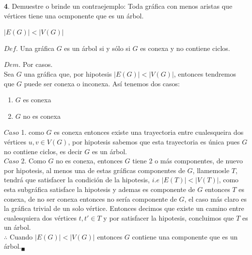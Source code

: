 \documentclass[12pt]{article}
\begin{document}
\vspace{1cm}
%
%
\textbf{4}. Demuestre o brinde un contraejemplo: Toda gráfica con menos aristas que vértices tiene una ocmponente que es un árbol.

\begin{tcolorbox}[title=\textbf{Hipotesis}, colback=red!15!white, colframe=black!, breakable]
	$|E(G)| < |V(G)|$ 
\end{tcolorbox}

\begin{tcolorbox}[title=\textbf{Definiciones}, colback=blue!15!white, colframe=black!, breakable]
    $Def$. Una gráfica $G$ es un árbol si y sólo si $G$ es conexa y no contiene ciclos.
\end{tcolorbox}

$Dem$. Por casos.\\

Sea $G$ una gráfica que, por hipotesis $|E(G)| < |V(G)|$, entonces tendremos que $G$ puede ser conexa o inconexa. Así tenemos dos casos:
\begin{enumerate}
    \item $G$ es conexa
    \item $G$ no es conexa
\end{enumerate}

$Caso$ 1. como $G$ es conexa entonces existe una trayectoria entre cualesqueira dos vértices $u,v \in V(G)$, por hipotesis sabemos que 
esta trayectoria es única pues $G$ no contiene ciclos, es decir $G$ es un árbol.\\

$Caso$ 2. Como $G$ no es conexa, entonces $G$ tiene 2 o más componentes, de nuevo por hipotesis, al menos una de 
estas gráficas componentes de $G$, llamemosle $T$, tendrá que satisfacer la condición de la hipotesis, $i.e$ $|E(T)| < |V(T)|$,
como esta subgráfica satisface la hipotesis y ademas es componente de $G$ entonces $T$ es conexa, de no ser conexa entonces no sería componente de $G$,
el caso más claro es la gráfica trivial de un solo vértice. Entonces decimos que existe un camino entre cualesquiera dos vértices 
$t, t' \in T$ y por satisfacer la hipotesis, concluimos que $T$ es un árbol.\\

$\therefore$ Cuando $|E(G)| < |V(G)|$ entonces $G$ contiene una componente que es un árbol.$_{\blacksquare}$\\
\end{document}
